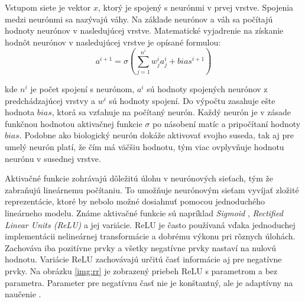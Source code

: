 Vstupom siete je vektor \begin{math}x\end{math}, ktorý je spojený s neurónmi v prvej vrstve. Spojenia medzi neurónmi sa nazývajú váhy. Na základe neurónov a váh sa počítajú hodnoty neurónov v nasledujúcej vrstve. Matematické vyjadrenie na získanie hodnôt neurónov v nasledujúcej vrstve je opísané formulou:
\begingroup
\large
\begin{equation}a^{i+1} = \sigma \left ( \sum_{j=1}^{n^i} w_{j}^i a_{j}^i + bias^{i+1} \right ) \end{equation}
\endgroup

kde \begin{math}n^{i}\end{math} je počet spojení s neurónom, \begin{math}a^{i}\end{math} sú hodnoty spojených neurónov z predchádzajúcej vrstvy a \begin{math}w^{i}\end{math} sú hodnoty spojení. Do výpočtu zasahuje ešte hodnota \begin{math}bias\end{math}, ktorá sa vzťahuje na počítaný neurón. Každý neurón je v zásade funkčnou hodnotou aktivačnej funkcie \begin{math}\sigma\end{math} po násobení matíc a pripočítaní hodnoty \begin{math}bias\end{math}. Podobne ako biologický neurón dokáže aktivovať svojho suseda, tak aj pre umelý neurón platí, že čím má väčšiu hodnotu, tým viac ovplyvňuje hodnotu neurónu v susednej vrstve.


Aktivačné funkcie zohrávajú dôležitú úlohu v neurónových sieťach, tým že zabraňujú lineárnemu počítaniu. To umožňuje neurónovým sieťam vyvíjať zložité reprezentácie, ktoré by nebolo možné dosiahnuť pomocou jednoduchého lineárneho modelu. Známe aktivačné funkcie sú napríklad \textit{Sigmoid} \cite{sigmoid}, \textit{Rectified Linear Units (ReLU)} \cite{relu} a jej variácie. ReLU je často používaná vďaka jednoduchej implementácii nelineárnej transformácie a dobrému výkonu pri rôznych úlohách. Zachováva iba pozitívne prvky a všetky negatívne prvky nastaví na nulovú hodnotu. Variácie ReLU zachovávajú určitú časť informácie aj pre negatívne prvky. Na obrázku \ref{img:rr} je zobrazený priebeh ReLU s parametrom a bez parametra. Parameter pre negatívnu časť nie je konštantný, ale je adaptívny na naučenie \cite{prelu}.

